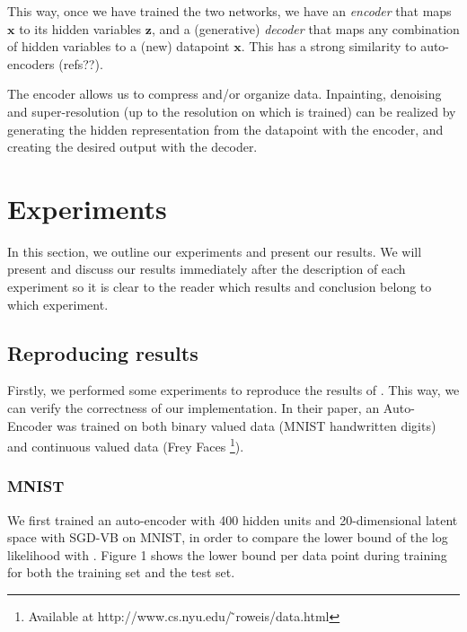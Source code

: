 \documentclass{article}
\begin{document}
This way, once we have trained the two networks, we have an \textit{encoder} that maps $\mathbf{x}$ to its hidden variables $\mathbf{z}$, and a (generative) \textit{decoder} that maps any combination of hidden variables to a (new) datapoint $\mathbf{x}$. This has a strong similarity to auto-encoders (refs??). 

The encoder allows us to compress and/or organize data. Inpainting, denoising and super-resolution (up to the resolution on which is trained) can be realized by generating the hidden representation from the datapoint with the encoder, and creating the desired output with the decoder.

\section{Experiments}

In this section, we outline our experiments and present our results. We will present and discuss our results immediately after the description of each experiment so it is clear to the reader which results and conclusion belong to which experiment.

\subsection{Reproducing results}

Firstly, we performed some experiments to reproduce the results of \cite{kingma2013auto}. This way, we can verify the correctness of our implementation. In their paper, an Auto-Encoder was trained on both binary valued data (MNIST handwritten digits) and continuous valued data (Frey Faces \footnote{Available at http://www.cs.nyu.edu/ ̃roweis/data.html}).

\subsubsection{MNIST}

We first trained an auto-encoder with 400 hidden units and 20-dimensional latent space with SGD-VB on MNIST, in order to compare the lower bound of the log likelihood with \cite{kingma2013auto}. Figure 1 shows the lower bound per data point during training for both the training set and the test set.  \\ 
\end{document}
